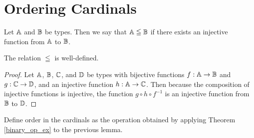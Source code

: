 \documentclass[../../math.tex]{subfiles}
\begin{document}
\section{Ordering Cardinals}

\begin{definition}
    Let $\mathbb{A}$ and $\mathbb{B}$ be types.  Then we say that $\mathbb{A} \leqq \mathbb{B}$ if there exists
    an injective function from $\mathbb{A}$ to $\mathbb{B}$.
\end{definition}

\begin{lemma}
    The relation $\leqq$ is well-defined.
\end{lemma}
\begin{proof}
    Let $\mathbb{A}$, $\mathbb{B}$, $\mathbb{C}$, and $\mathbb{D}$ be types with bijective functions $f : \mathbb{A} \to
    \mathbb{B}$ and $g : \mathbb{C} \to \mathbb{D}$, and an injective function $h : \mathbb{A} \to \mathbb{C}$.  Then
    because the composition of injective functions is injective, the function $g
    \circ h \circ f^{-1}$ is an injective function from $\mathbb{B}$ to $\mathbb{D}$.
\end{proof}

\begin{instance}
    Define order in the cardinals as the operation obtained by applying Theorem
    \ref{binary_op_ex} to the previous lemma.
\end{instance}
\end{document}

